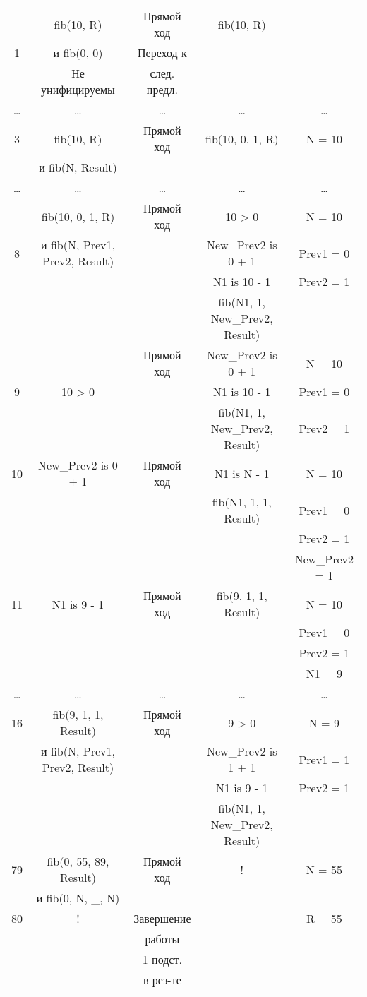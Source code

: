 \begin{landscape}
\begin{longtable}{|c|c|c|c|c|}
        \hline
              & fib(10, R) & Прямой ход & fib(10, R) & \\
            1 & и fib(0, 0) & Переход к & &\\
			  & Не унифицируемы & след. предл. & &\\
			\hline
			\dots & \dots & \dots & \dots & \dots \\
			\hline 
			3 & fib(10, R) & Прямой ход & fib(10, 0, 1, R) & N = 10\\
              & и fib(N, Result) & & &\\
            \hline
			\dots & \dots & \dots & \dots & \dots \\
		    \hline 
			  & fib(10, 0, 1, R) & Прямой ход & 10 > 0 & N = 10\\
            8 & и fib(N, Prev1, Prev2, Result) & & New\_Prev2 is 0 + 1 & Prev1 = 0\\
              & & & N1 is 10 - 1 & Prev2 = 1\\
              & & & fib(N1, 1, New\_Prev2, Result) &\\
            \hline 
			  & & Прямой ход & New\_Prev2 is 0 + 1 & N = 10\\
            9 & 10 > 0 & & N1 is 10 - 1 & Prev1 = 0\\
              & & & fib(N1, 1, New\_Prev2, Result) & Prev2 = 1\\
            \hline 
			10 & New\_Prev2 is 0 + 1 & Прямой ход & N1 is N - 1 & N = 10\\
              & & & fib(N1, 1, 1, Result) & Prev1 = 0\\
              & & & & Prev2 = 1\\
              & & & & New\_Prev2 = 1\\
            \hline 
			11 & N1 is 9 - 1 & Прямой ход & fib(9, 1, 1, Result) & N = 10\\
              & & & & Prev1 = 0\\
              & & & & Prev2 = 1\\
              & & & & N1 = 9\\
            \hline
			\dots & \dots & \dots & \dots & \dots \\
            \hline 
			16 & fib(9, 1, 1, Result) & Прямой ход & 9 > 0 & N = 9\\
              & и fib(N, Prev1, Prev2, Result) & & New\_Prev2 is 1 + 1 & Prev1 = 1\\
              & & & N1 is 9 - 1 & Prev2 = 1\\
              & & & fib(N1, 1, New\_Prev2, Result) & \\
            \hline 
			79 & fib(0, 55, 89, Result) & Прямой ход & ! & N = 55\\
              & и fib(0, N, \_, N) & & & \\
			\hline
            80  & ! & Завершение & & R = 55 \\
              & & работы & &\\
              & & 1 подст. & & \\
              & & в рез-те & & \\
    \end{longtable}
\end{landscape}

